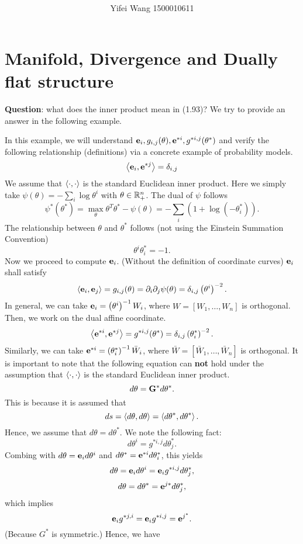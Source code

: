 \documentclass[11pt]{article}
\author{Yifei Wang 1500010611}
\title{\textbf{\titlemark}}
\date{}
\begin{document}
\maketitle

\section{Manifold, Divergence and Dually flat structure}
\textbf{Question}: what does the inner product mean in (1.93)? We try to provide an answer in the following example.
\begin{example}
In this example, we will understand $\mathbf{e}_i,g_{i,j}(\theta),\mathbf{e}^{*i},g^{*i,j}(\theta^*)$ and verify the following relationship (definitions) via a concrete example of probability models. 
$$
\left\langle \mathbf{e}_i,\mathbf{e}^{*j}\right\rangle=\delta_{i,j}
$$
We assume that $\left\langle \cdot,\cdot\right\rangle$ is the standard Euclidean inner product.
Here we simply take $\psi(\theta)=-\sum_i\log \theta^i$ with $\theta\in\mathbb{R}^n_+$. The dual of $\psi$ follows 
$$
\psi^*(\theta^*) = \max_\theta \theta^T\theta^*-\psi(\theta)=-\sum_i(1+\log(-\theta^*_i)).
$$
The relationship between $\theta$ and $\theta^*$ follows (not using the Einstein Summation Convention)
$$
\theta^i\theta^{*}_i=-1. 
$$
Now we proceed to compute $\mathbf{e}_i$. (Without the definition of coordinate curves)
$\mathbf{e}_i$ shall satisfy
$$
\left\langle \mathbf{e}_i,\mathbf{e}_j\right\rangle=g_{i,j}(\theta)=\partial_i\partial_j\psi(\theta)=\delta_{i,j}\left(\theta^i\right)^{-2}.
$$
In general,  we can take $\mathbf{e}_i =\left( \theta^i\right)^{-1}W_i$, where $W=[W_1,\dots,W_n]$ is orthogonal. 
Then, we work on the dual affine coordinate. 
$$
\left\langle \mathbf{e}^{*i},\mathbf{e}^{*j}\right\rangle=g^{*i,j}(\theta^*)=\delta_{i,j}\left(\theta^*_i\right)^{-2}.
$$
Similarly, we can take $\mathbf{e}^{*i} =\left( \theta^*_i\right)^{-1}\bar W_i$, where $\bar W=[\bar W_1,\dots,\bar W_n]$  is orthogonal. It is important to note that the following equation can \textbf{not} hold under the assumption that $\left\langle \cdot,\cdot\right\rangle$ is the standard Euclidean inner product.
$$
d\theta =\mathbf{G}^* d\theta^*.
$$
This is because it is assumed that
$$
ds = \left\langle d\theta,d\theta\right\rangle = \left\langle d\theta^*,d\theta^*\right\rangle.
$$
Hence, we assume that $d\theta = d\theta^*$. We note the following fact:
$$d\theta^i=g^{*i,j}d\theta^*_j.$$
Combing with  $d\theta=\mathbf{e}_id \theta^i$ and $d\theta^*=\mathbf{e}^{*i}d \theta_i^*$, this yields
$$
d\theta =\mfe_id\theta^i=\mfe_ig^{*i,j}d\theta_j^*,%
$$
$$
d\theta = d\theta^*=\mathbf{e}^{j*}d\theta_j^*,
$$
which implies
$$
\mathbf{e}_ig^{*j,i}=\mathbf{e}_ig^{*i,j}=\mathbf{e}^{j^*}.
$$
(Because $G^*$ is symmetric.) Hence, we have 

\end{example}
\end{document}
